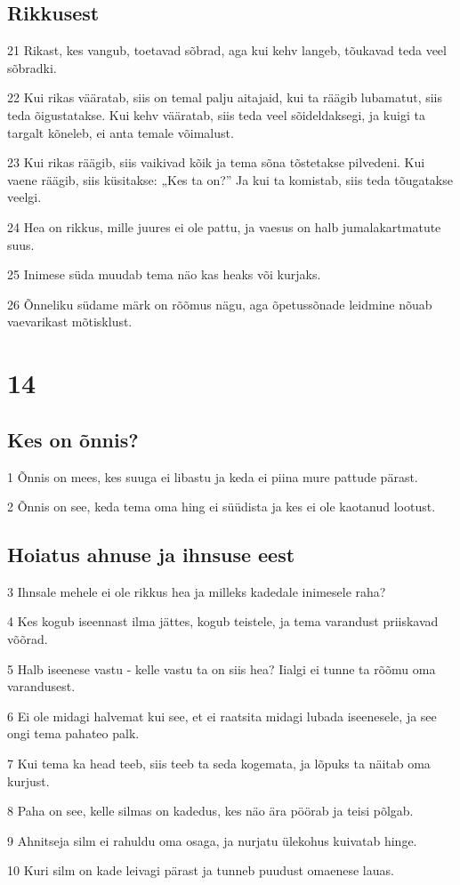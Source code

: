 \section*{Rikkusest}

\par 21 Rikast, kes vangub, toetavad sõbrad, aga kui kehv langeb, tõukavad teda veel sõbradki.
\par 22 Kui rikas vääratab, siis on temal palju aitajaid, kui ta räägib lubamatut, siis teda õigustatakse. Kui kehv vääratab, siis teda veel sõideldaksegi, ja kuigi ta targalt kõneleb, ei anta temale võimalust.
\par 23 Kui rikas räägib, siis vaikivad kõik ja tema sõna tõstetakse pilvedeni. Kui vaene räägib, siis küsitakse: „Kes ta on?” Ja kui ta komistab, siis teda tõugatakse veelgi.
\par 24 Hea on rikkus, mille juures ei ole pattu, ja vaesus on halb jumalakartmatute suus.
\par 25 Inimese süda muudab tema näo kas heaks või kurjaks.
\par 26 Õnneliku südame märk on rõõmus nägu, aga õpetussõnade leidmine nõuab vaevarikast mõtisklust.

\chapter{14}

\section*{Kes on õnnis?}

\par 1 Õnnis on mees, kes suuga ei libastu ja keda ei piina mure pattude pärast.
\par 2 Õnnis on see, keda tema oma hing ei süüdista ja kes ei ole kaotanud lootust.
\section*{Hoiatus ahnuse ja ihnsuse eest}

\par 3 Ihnsale mehele ei ole rikkus hea ja milleks kadedale inimesele raha?
\par 4 Kes kogub iseennast ilma jättes, kogub teistele, ja tema varandust priiskavad võõrad.
\par 5 Halb iseenese vastu - kelle vastu ta on siis hea? Iialgi ei tunne ta rõõmu oma varandusest.
\par 6 Ei ole midagi halvemat kui see, et ei raatsita midagi lubada iseenesele, ja see ongi tema pahateo palk.
\par 7 Kui tema ka head teeb, siis teeb ta seda kogemata, ja lõpuks ta näitab oma kurjust.
\par 8 Paha on see, kelle silmas on kadedus, kes näo ära pöörab ja teisi põlgab.
\par 9 Ahnitseja silm ei rahuldu oma osaga, ja nurjatu ülekohus kuivatab hinge.
\par 10 Kuri silm on kade leivagi pärast ja tunneb puudust omaenese lauas.


